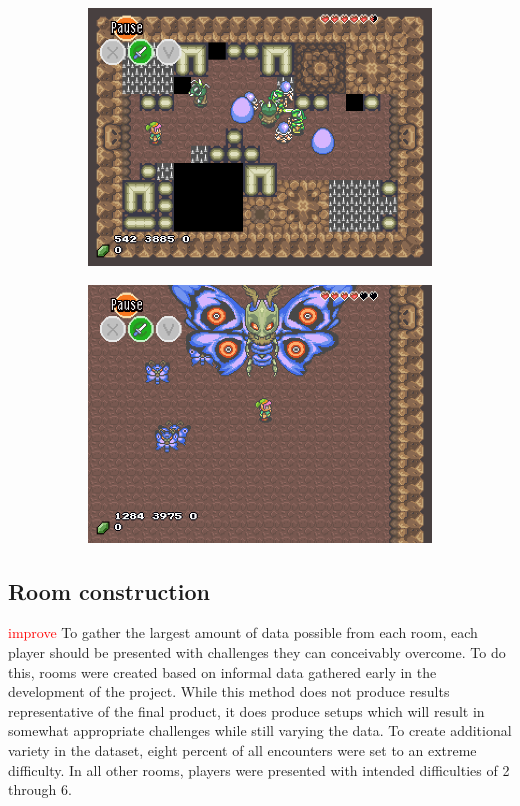 \documentclass[a4paper]{article}
\begin{document}
\begin{multicols*}{2}
\begin{figure}
\begin{subfigure}[b]{0.45\textwidth}
  \includegraphics[width=\textwidth]{dungeonroom}
\end{subfigure} \hfill
\begin{subfigure}[b]{0.45\textwidth}
  \includegraphics[width=\textwidth]{bossroom}
\end{subfigure} \hfill
\end{figure}

\subsection{Room construction}
\textcolor{red}{improve}
To gather the largest amount of data possible from each room, each player should be presented with challenges they can conceivably overcome. To do this, rooms were created based on informal data gathered early in the development of the project. While this method does not produce results representative of the final product, it does produce setups which will result in somewhat appropriate challenges while still varying the data. To create additional variety in the dataset, eight percent of all encounters were set to an extreme difficulty. In all other rooms, players were presented with intended difficulties of 2 through 6.


\end{multicols*}
\end{document}
